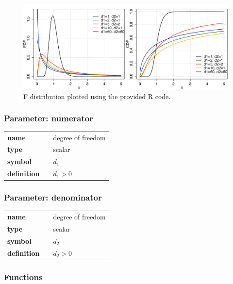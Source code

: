 \documentclass{article}
\begin{document}
\begin{figure}[ht!]
\centering
  \includegraphics[width=140mm]{pics/F.pdf}
 \caption{F distribution plotted using the provided R code.}
 \label{fig:F}
\end{figure}

\subsubsection*{Parameter: numerator}

\noindent\begin{tabular}{p{2cm}cl}
\textbf{name} & & degree of freedom \\
\textbf{type} & & scalar \\
\textbf{symbol} & & $d_1$  \\
\textbf{definition} & & $d_1 > 0$
\end{tabular}
\subsubsection*{Parameter: denominator}

\noindent\begin{tabular}{p{2cm}cl}
\textbf{name} & & degree of freedom \\
\textbf{type} & & scalar \\
\textbf{symbol} & & $d_2$  \\
\textbf{definition} & & $d_2 > 0$
\end{tabular}
\subsubsection*{Functions}
\end{document}
